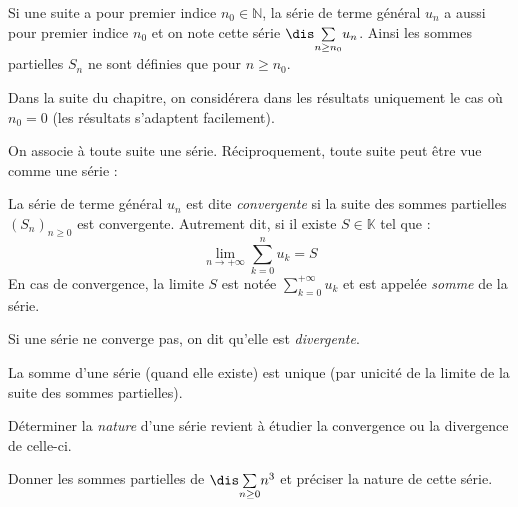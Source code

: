 \documentclass[french,11pt,twoside]{VcCours}
\newcommand{\Sum}[2]{\ensuremath{\textstyle{\sum\limits_{#1}^{#2}}}}
\begin{document}
\begin{rems}
\item Si une suite a pour premier indice $n_0 \in \mathbb{N}$, la série de terme général $u_n$ a aussi pour premier indice $n_0$ et on note cette série $\dis \Sum{n \geq n_0}{} u_n$. Ainsi les sommes partielles $S_n$ ne sont définies que pour $n \geq n_0$. 

\medskip

Dans la suite du chapitre, on considérera dans les résultats uniquement le cas où $n_0=0$ (les résultats s'adaptent facilement).
\item On associe à toute suite une série. Réciproquement, toute suite peut être vue comme une série :

%

\vspace{4cm}
\end{rems}

\begin{defin}
La série de terme général $u_n$ est dite \textit{convergente} si la suite des sommes partielles $(S_n)_{n \geq 0}$ est convergente. Autrement dit, si il existe $S \in \mathbb{K}$ tel que :
$$ \lim_{n \rightarrow + \infty} \sum_{k=0}^n u_k = S $$
En cas de convergence, la limite $S$ est notée $\Sum{k=0}{+ \infty} u_k$ et est appelée \textit{somme} de la série.
\end{defin}

\begin{defin} Si une série ne converge pas, on dit qu'elle est \textit{divergente}.
\end{defin}

\begin{rems}
\item La somme d'une série (quand elle existe) est unique (par unicité de la limite de la suite des sommes partielles).
\item Déterminer la \textit{nature} d'une série revient à étudier la convergence ou la divergence de celle-ci.
\end{rems}

\begin{exa} Donner les sommes partielles de $\dis \Sum{n \geq 0}{} n^3$ et préciser la nature de cette série.
\end{exa} 
\end{document}
